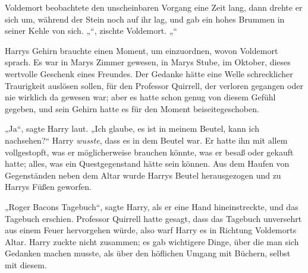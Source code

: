 Voldemort beobachtete den unscheinbaren Vorgang eine Zeit lang, dann drehte er sich um, während der Stein noch auf ihr lag, und gab ein hohes Brummen in seiner Kehle von sich.
„“, zischte Voldemort. „“

Harrys Gehirn brauchte einen Moment, um einzuordnen, wovon Voldemort sprach. Es war in Marys Zimmer gewesen, in Marys Stube, im Oktober, dieses wertvolle Geschenk eines Freundes. Der Gedanke hätte eine Welle schrecklicher Traurigkeit auslösen sollen, für den Professor Quirrell, der verloren gegangen oder nie wirklich da gewesen war; aber es hatte schon genug von diesem Gefühl gegeben, und sein Gehirn hatte es für den Moment beiseitegeschoben.

„Ja“, sagte Harry laut.
„Ich glaube, es ist in meinem Beutel, kann ich nachsehen?“
Harry \emph{wusste}, dass es in dem Beutel war. Er hatte ihn mit allem vollgestopft, was er möglicherweise brauchen könnte, was er besaß oder gekauft hatte; alles, was ein Questgegenstand hätte sein können.
Aus dem Haufen von Gegenständen neben dem Altar wurde Harrys Beutel herausgezogen und zu Harrys Füßen geworfen.

„Roger Bacons Tagebuch“, sagte Harry, als er eine Hand hineinstreckte, und das Tagebuch erschien. Professor Quirrell hatte gesagt, dass das Tagebuch unversehrt aus einem Feuer hervorgehen würde, also warf Harry es in Richtung Voldemorts Altar. Harry zuckte nicht zusammen; es gab wichtigere Dinge, über die man sich Gedanken machen musste, als über den höflichen Umgang mit Büchern, selbst mit diesem.

